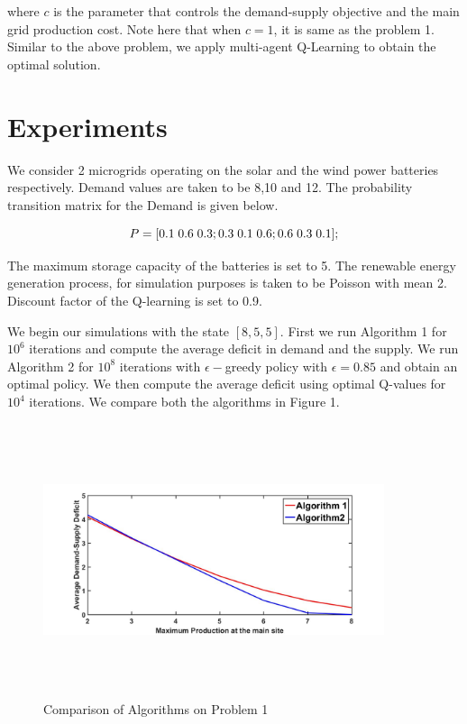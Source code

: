 \documentclass[conference]{IEEEtran}
\begin{document}
where $c$ is the parameter that controls the demand-supply objective and the main grid production cost. Note here that when $c =1$, it is same as the problem 1. Similar to the above problem, we apply multi-agent Q-Learning to obtain the optimal solution. 

\section{Experiments}
We consider 2 microgrids operating on the solar and the wind power batteries respectively. Demand values are taken to be 8,10 and 12. The probability transition matrix for the Demand is given below. 

$$ P = [0.1\hspace{0.1cm}0.6\hspace{0.1cm} 0.3; 0.3\hspace{0.1cm} 0.1\hspace{0.1cm} 0.6; 0.6 \hspace{0.1cm}0.3 \hspace{0.1cm}0.1];$$

The maximum storage capacity of the batteries is set to 5. The renewable energy generation process, for simulation purposes is taken to be Poisson with mean 2. Discount factor of the Q-learning is set to 0.9.

We begin our simulations with the state $[8,5,5]$. First we run Algorithm 1 for $10^6$ iterations and compute the average deficit in demand and the supply. We run Algorithm 2 for $10^8$ iterations with $\epsilon-$greedy policy with $\epsilon = 0.85$ and obtain an optimal policy. We then compute the average deficit using optimal Q-values for $10^4$ iterations. We compare both the algorithms in Figure 1.

\begin{figure}[]
\begin{center}
 \includegraphics[width = 10cm, height = 8cm]{plot1.jpg}
 \caption{Comparison of Algorithms on Problem 1}
 \end{center}
 \end{figure}
\end{document}
